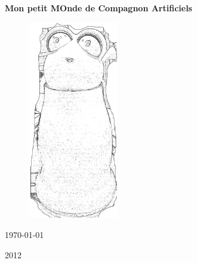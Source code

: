 \begin{titlepage}

\begin{center}



{ \LARGE \bfseries Mon petit MOnde de Compagnon Artificiels}\\[0.8cm]
\begin{figure}[ht]
\centering
\includegraphics[width=0.35\textwidth]{reeti.jpg}\\[1cm]
\end{figure}
\vspace*{3cm}


\begin{minipage}{0.4\textwidth}
\begin{flushleft} 
\large \today
\end{flushleft}
\end{minipage}
\begin{minipage}{0.4\textwidth}
\begin{flushright} 
\large 2012
\end{flushright}
\end{minipage}

\end{center}
\end{titlepage}
